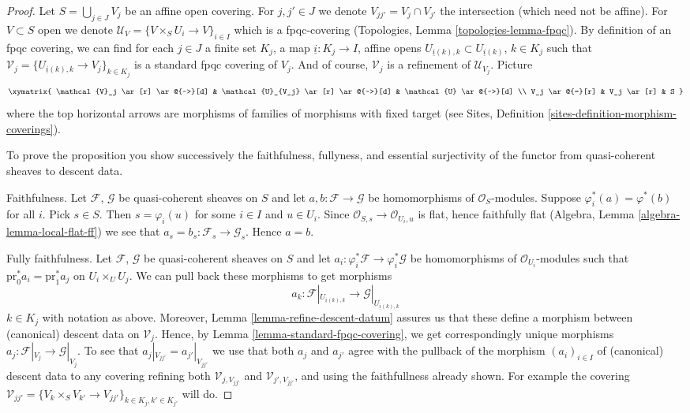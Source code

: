 \begin{proof}
Let $S = \bigcup_{j \in J} V_j$ be an affine open covering.
For $j, j' \in J$ we denote $V_{jj'} = V_j \cap V_{j'}$ the intersection
(which need not be affine). For $V \subset S$ open we denote
$\mathcal{U}_V = \{V \times_S U_i \to V\}_{i \in I}$ which is a
fpqc-covering (Topologies, Lemma \ref{topologies-lemma-fpqc}).
By definition of an fpqc covering, we can find for each $j \in J$ a
finite set $K_j$, a map $\underline{i} : K_j \to I$,
affine opens $U_{\underline{i}(k), k} \subset U_{\underline{i}(k)}$,
$k \in K_j$ such that
$\mathcal{V}_j = \{U_{\underline{i}(k), k} \to V_j\}_{k \in K_j}$ is
a standard fpqc covering of $V_j$. And of course, $\mathcal{V}_j$
is a refinement of $\mathcal{U}_{V_j}$. Picture
$$
\xymatrix{
\mathcal{V}_j \ar[r] \ar@{~>}[d] &
\mathcal{U}_{V_j} \ar[r] \ar@{~>}[d] &
\mathcal{U} \ar@{~>}[d] \\
V_j \ar@{=}[r] & V_j \ar[r] & S
}
$$
where the top horizontal arrows are morphisms of families of
morphisms with fixed target (see
Sites, Definition \ref{sites-definition-morphism-coverings}).

\medskip\noindent
To prove the proposition you show successively the
faithfulness, fullyness, and essential surjectivity of the
functor from quasi-coherent sheaves to descent data.

\medskip\noindent
Faithfulness. Let $\mathcal{F}$, $\mathcal{G}$ be quasi-coherent
sheaves on $S$ and let $a, b : \mathcal{F} \to \mathcal{G}$ be
homomorphisms of $\mathcal{O}_S$-modules.
Suppose $\varphi_i^*(a) = \varphi^*(b)$ for all $i$.
Pick $s \in S$. Then $s = \varphi_i(u)$ for some $i \in I$ and
$u \in U_i$. Since $\mathcal{O}_{S, s} \to \mathcal{O}_{U_i, u}$
is flat, hence faithfully flat
(Algebra, Lemma \ref{algebra-lemma-local-flat-ff}) we see
that $a_s = b_s : \mathcal{F}_s \to \mathcal{G}_s$. Hence $a = b$.

\medskip\noindent
Fully faithfulness. Let $\mathcal{F}$, $\mathcal{G}$ be quasi-coherent
sheaves on $S$ and let
$a_i : \varphi_i^*\mathcal{F} \to \varphi_i^*\mathcal{G}$ be
homomorphisms of $\mathcal{O}_{U_i}$-modules such that
$\text{pr}_0^*a_i = \text{pr}_1^*a_j$ on $U_i \times_U U_j$.
We can pull back these morphisms to get morphisms
$$
a_k :
\mathcal{F}|_{U_{\underline{i}(k), k}}
\longrightarrow
\mathcal{G}|_{U_{\underline{i}(k), k}}
$$
$k \in K_j$ with notation as above. Moreover,
Lemma \ref{lemma-refine-descent-datum} assures us
that these define a morphism between (canonical) descent data on
$\mathcal{V}_j$. Hence, by
Lemma \ref{lemma-standard-fpqc-covering}, we get correspondingly
unique morphisms $a_j : \mathcal{F}|_{V_j} \to \mathcal{G}|_{V_j}$.
To see that $a_j|_{V_{jj'}} = a_{j'}|_{V_{jj'}}$ we use that
both $a_j$ and $a_{j'}$ agree with the pullback of the morphism
$(a_i)_{i \in I}$ of (canonical) descent data to any covering
refining both $\mathcal{V}_{j, V_{jj'}}$ and
$\mathcal{V}_{j', V_{jj'}}$, and using the faithfullness already
shown. For example the covering
$\mathcal{V}_{jj'} =
\{V_k \times_S V_{k'} \to V_{jj'}\}_{k \in K_j, k' \in K_{j'}}$
will do.


\end{proof}
